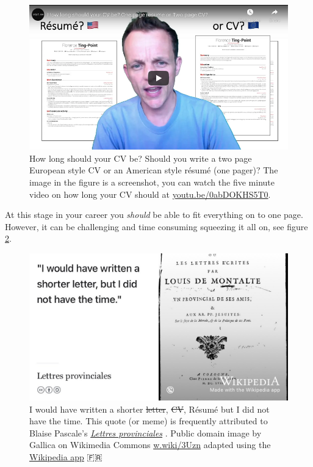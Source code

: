 \documentclass[
]{book}
\begin{document}
\begin{figure}

{\centering \includegraphics[width=0.99\linewidth]{images/youtube-resume-or-cv} 

}

\caption{How long should your CV be? Should you write a two page European style CV or an American style résumé (one pager)? \citep{youtube-resume-or-cv} The image in the figure is a screenshot, you can watch the five minute video on how long your CV should at \href{https://youtu.be/0abDOKHS5T0}{youtu.be/0abDOKHS5T0}.}\label{fig:oneortwopager-fig}
\end{figure}



At this stage in your career you \emph{should} be able to fit everything on to one page. However, it can be challenging and time consuming squeezing it all on, see figure \ref{fig:shorterletter-fig}.

\begin{figure}

{\centering \includegraphics[width=0.98\linewidth]{images/shorterletter} 

}

\caption{I would have written a shorter \sout{letter}, \sout{CV}, Résumé but I did not have the time. This quote (or meme) is frequently attributed to Blaise Pascale's \emph{\href{https://en.wikipedia.org/wiki/Lettres_provinciales}{Lettres provinciales}} \citep{shorterletter}. Public domain image by Gallica on Wikimedia Commons \href{https://w.wiki/3Uzn}{w.wiki/3Uzn} adapted using the \href{https://apps.apple.com/us/app/wikipedia/id324715238}{Wikipedia app} 🇫🇷}\label{fig:shorterletter-fig}
\end{figure}
\end{document}
